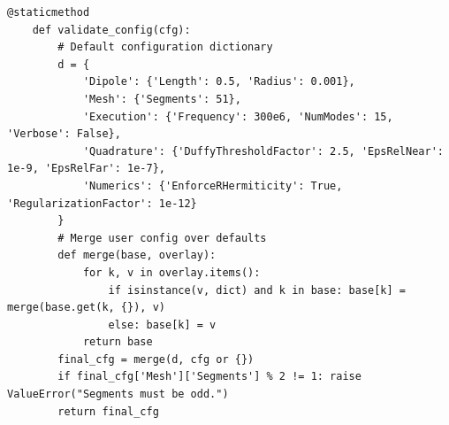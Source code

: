 \documentclass[11pt, a4paper]{report}
\begin{document}
\begin{lstlisting}[caption={The core MoM/CMA solver in Python.}, label={lst:main_cma}]
    @staticmethod
    def validate_config(cfg):
        # Default configuration dictionary
        d = {
            'Dipole': {'Length': 0.5, 'Radius': 0.001},
            'Mesh': {'Segments': 51},
            'Execution': {'Frequency': 300e6, 'NumModes': 15, 'Verbose': False},
            'Quadrature': {'DuffyThresholdFactor': 2.5, 'EpsRelNear': 1e-9, 'EpsRelFar': 1e-7},
            'Numerics': {'EnforceRHermiticity': True, 'RegularizationFactor': 1e-12}
        }
        # Merge user config over defaults
        def merge(base, overlay):
            for k, v in overlay.items():
                if isinstance(v, dict) and k in base: base[k] = merge(base.get(k, {}), v)
                else: base[k] = v
            return base
        final_cfg = merge(d, cfg or {})
        if final_cfg['Mesh']['Segments'] % 2 != 1: raise ValueError("Segments must be odd.")
        return final_cfg
\end{lstlisting}
\end{document}
